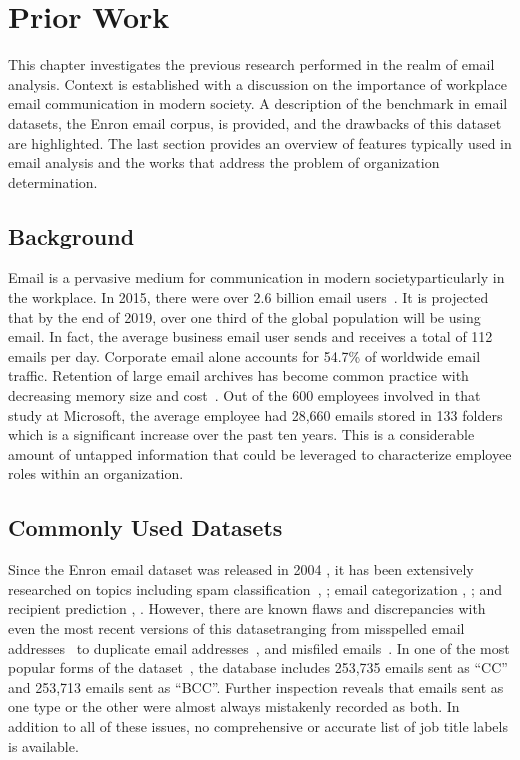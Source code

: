 \documentclass[12pt]{report}
\begin{document}
\chapter{Prior Work} \label{PriorWork}
This chapter investigates the previous research performed in the realm of email analysis.
Context is established with a discussion on the importance of workplace email communication in modern society.
A description of the benchmark in email datasets, the Enron email corpus, is provided, and the drawbacks of this dataset are highlighted.
The last section provides an overview of features typically used in email analysis and the works that address the problem of organization determination.

\section{Background}
Email is a pervasive medium for communication in modern society\textemdash{}particularly in the workplace.
In 2015, there were over 2.6 billion email users~\cite{radicati_emails_2015}.
It is projected that by the end of 2019, over one third of the global population will be using email.
In fact, the average business email user sends and receives a total of 112 emails per day.
Corporate email alone accounts for 54.7\% of worldwide email traffic.
Retention of large email archives has become common practice with decreasing memory size and cost~\cite{fisher_revisiting_2006}.
Out of the 600 employees involved in that study at Microsoft, the average employee had 28,660 emails stored in 133 folders which is a significant increase over the past ten years.
This is a considerable amount of untapped information that could be leveraged to characterize employee roles within an organization.
\section{Commonly Used Datasets}
Since the Enron email dataset was released in 2004 \cite{klimt_introducing_2004}, it has been extensively researched on topics including spam classification~\cite{gaber_e-mail_2016}, \cite{shams_classifying_2013}; email categorization \cite{he_novel_2014}, \cite{keila_structure_2005}; and recipient prediction \cite{sofershtein_predicting_2015}, \cite{hu_towards_2012}.
However, there are known flaws and discrepancies with even the most recent versions of this dataset\textemdash{}ranging from misspelled email addresses~\cite{nordbo_data_2014} to duplicate email addresses~\cite{waterman_big_2014}, and misfiled emails~\cite{namata_inferring_2006}.
In one of the most popular forms of the dataset~\cite{shetty_enron_2004}, the database includes 253,735 emails sent as ``CC'' and  253,713 emails sent as ``BCC''.
Further inspection reveals that emails sent as one type or the other were almost always mistakenly recorded as both.  In addition to all of these issues, no comprehensive or accurate list of job title labels is available.
\end{document}
